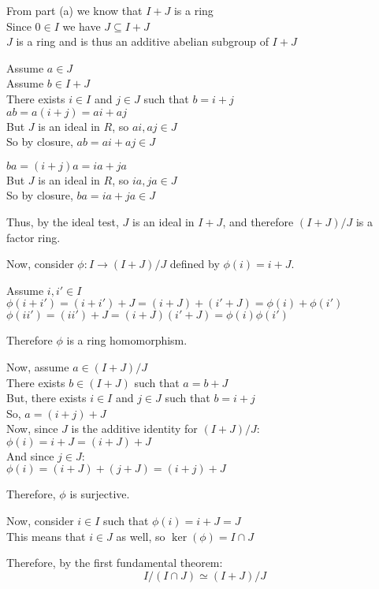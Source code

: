 \documentclass[letterpaper,12pt,fleqn]{article}
\begin{document}
\begin{enumerate}
\begin{enumerate}
    From part (a) we know that $I+J$ is a ring \\
    Since $0\in I$ we have $J\subseteq I+J$ \\
    $J$ is a ring and is thus an additive abelian subgroup of $I+J$

    Assume $a\in J$ \\
    Assume $b\in I+J$ \\
    There exists $i\in I$ and $j\in J$ such that $b=i+j$ \\
    $ab=a(i+j)=ai+aj$ \\
    But $J$ is an ideal in $R$, so $ai,aj\in J$ \\
    So by closure, $ab=ai+aj\in J$

    $ba=(i+j)a=ia+ja$ \\
    But $J$ is an ideal in $R$, so $ia,ja\in J$ \\
    So by closure, $ba=ia+ja\in J$

    Thus, by the ideal test, $J$ is an ideal in $I+J$, and therefore $(I+J)/J$
    is a factor ring.

    Now, consider $\phi:I\to(I+J)/J$ defined by $\phi(i)=i+J$.

    Assume $i,i'\in I$ \\
    $\phi(i+i')=(i+i')+J=(i+J)+(i'+J)=\phi(i)+\phi(i')$ \\
    $\phi(ii')=(ii')+J=(i+J)(i'+J)=\phi(i)\phi(i')$

    Therefore $\phi$ is a ring homomorphism.

    Now, assume $a\in(I+J)/J$ \\
    There exists $b\in(I+J)$ such that $a=b+J$ \\
    But, there exists $i\in I$ and $j\in J$ such that $b=i+j$ \\
    So, $a=(i+j)+J$ \\
    Now, since $J$ is the additive identity for $(I+J)/J$: \\
    $\phi(i)=i+J=(i+J)+J$ \\
    And since $j\in J$: \\
    $\phi(i)=(i+J)+(j+J)=(i+j)+J$

    Therefore, $\phi$ is surjective.

    Now, consider $i\in I$ such that $\phi(i)=i+J=J$ \\
    This means that $i\in J$ as well, so $\ker(\phi)=I\cap J$

    Therefore, by the first fundamental theorem:
    \[I/(I\cap J)\simeq(I+J)/J\]
  \end{enumerate}
  

\end{enumerate}
\end{document}
